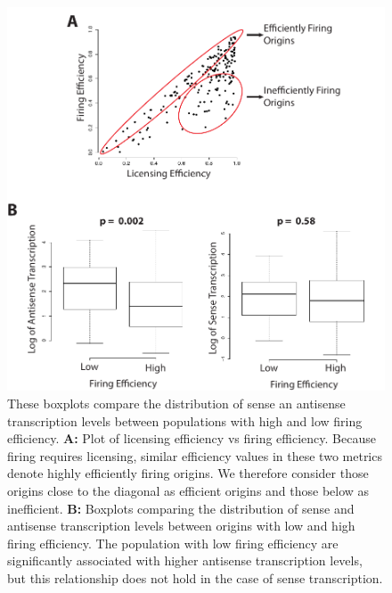 \begin{figure}[h!]

\centering
\includegraphics[width=\textwidth]{figures/results/firing}
\caption[Boxplots comparing transcription levels in high- and low-firing populations]{These boxplots compare the distribution of sense an antisense transcription levels between populations with high and low firing efficiency. \textbf{A: }Plot of licensing efficiency vs firing efficiency. Because firing requires licensing, similar efficiency values in these two metrics denote highly efficiently firing origins. We therefore consider those origins close to the diagonal as efficient origins and those below as inefficient. \textbf{B: } Boxplots comparing the distribution of sense and antisense transcription levels between origins with low and high firing efficiency. The population with low firing efficiency are significantly associated with higher antisense transcription levels, but this relationship does not hold in the case of sense transcription. }
\label{fig:firing}

\end{figure} 

